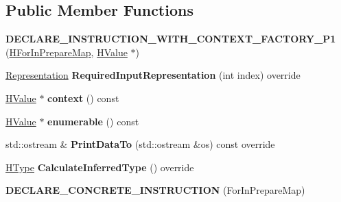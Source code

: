 \subsection*{Public Member Functions}
\begin{DoxyCompactItemize}
\item 
{\bfseries D\+E\+C\+L\+A\+R\+E\+\_\+\+I\+N\+S\+T\+R\+U\+C\+T\+I\+O\+N\+\_\+\+W\+I\+T\+H\+\_\+\+C\+O\+N\+T\+E\+X\+T\+\_\+\+F\+A\+C\+T\+O\+R\+Y\+\_\+\+P1} (\hyperlink{classv8_1_1internal_1_1_h_for_in_prepare_map}{H\+For\+In\+Prepare\+Map}, \hyperlink{classv8_1_1internal_1_1_h_value}{H\+Value} $\ast$)\hypertarget{classv8_1_1internal_1_1_h_for_in_prepare_map_a73a94d5d3409f26288ba8397e8315cfb}{}\label{classv8_1_1internal_1_1_h_for_in_prepare_map_a73a94d5d3409f26288ba8397e8315cfb}

\item 
\hyperlink{classv8_1_1internal_1_1_representation}{Representation} {\bfseries Required\+Input\+Representation} (int index) override\hypertarget{classv8_1_1internal_1_1_h_for_in_prepare_map_a3248a3bfa32728562c5cf797dd059184}{}\label{classv8_1_1internal_1_1_h_for_in_prepare_map_a3248a3bfa32728562c5cf797dd059184}

\item 
\hyperlink{classv8_1_1internal_1_1_h_value}{H\+Value} $\ast$ {\bfseries context} () const \hypertarget{classv8_1_1internal_1_1_h_for_in_prepare_map_a49678a169951459fc8430008900ca072}{}\label{classv8_1_1internal_1_1_h_for_in_prepare_map_a49678a169951459fc8430008900ca072}

\item 
\hyperlink{classv8_1_1internal_1_1_h_value}{H\+Value} $\ast$ {\bfseries enumerable} () const \hypertarget{classv8_1_1internal_1_1_h_for_in_prepare_map_ab388d4209e6f02faf6a3fc1b8d86e9b6}{}\label{classv8_1_1internal_1_1_h_for_in_prepare_map_ab388d4209e6f02faf6a3fc1b8d86e9b6}

\item 
std\+::ostream \& {\bfseries Print\+Data\+To} (std\+::ostream \&os) const  override\hypertarget{classv8_1_1internal_1_1_h_for_in_prepare_map_a1dc4196708cf09de7b267f14ddacbce2}{}\label{classv8_1_1internal_1_1_h_for_in_prepare_map_a1dc4196708cf09de7b267f14ddacbce2}

\item 
\hyperlink{classv8_1_1internal_1_1_h_type}{H\+Type} {\bfseries Calculate\+Inferred\+Type} () override\hypertarget{classv8_1_1internal_1_1_h_for_in_prepare_map_ab3bce6a9b23ec61cb7ad66ca5f4ac59a}{}\label{classv8_1_1internal_1_1_h_for_in_prepare_map_ab3bce6a9b23ec61cb7ad66ca5f4ac59a}

\item 
{\bfseries D\+E\+C\+L\+A\+R\+E\+\_\+\+C\+O\+N\+C\+R\+E\+T\+E\+\_\+\+I\+N\+S\+T\+R\+U\+C\+T\+I\+ON} (For\+In\+Prepare\+Map)\hypertarget{classv8_1_1internal_1_1_h_for_in_prepare_map_aa4a6d159ee07cc20680fab7ce07bb061}{}\label{classv8_1_1internal_1_1_h_for_in_prepare_map_aa4a6d159ee07cc20680fab7ce07bb061}

\end{DoxyCompactItemize}
